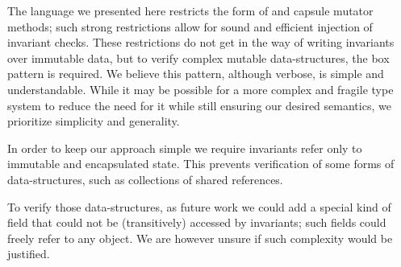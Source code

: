 







The language we presented here restricts the form of \Q@invariant@ and capsule mutator methods;
such strong restrictions allow for sound and efficient injection of invariant checks. 
These restrictions do not get in the way of writing invariants over immutable data, but to verify complex mutable data-structures, the box pattern is required. We believe this pattern, although verbose, is simple and understandable. While it may be possible for a more complex and fragile type system to reduce the need for it  while still ensuring our desired semantics, we prioritize simplicity and generality. 

In order to keep our approach simple we require invariants refer only to immutable and encapsulated state. This prevents verification of some forms of data-structures, such as collections of shared \Q@mut@ references.

To verify those data-structures, as future work we could add a special kind of field that could not be (transitively) accessed by invariants; such fields could freely refer to any object. We are however unsure if such complexity would be justified.



